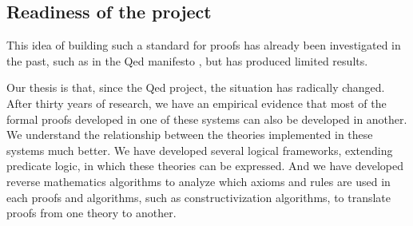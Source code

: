\subsection{Readiness of the project}

This idea of building such a standard for proofs has already been
investigated in the past, such as in the Qed manifesto \cite{Qed94}, but
has produced limited results.

Our thesis is that, since the
Qed project, the situation has radically changed. After
thirty years of research, we have an empirical evidence that most of
the formal proofs developed in one of these systems can also be
developed in another. We understand the relationship between the
theories implemented in these systems much better. We have developed
several logical frameworks, extending predicate logic, in which these
theories can be expressed. And we have developed reverse mathematics
algorithms to analyze which axioms and rules are used in each proofs
and algorithms, such as constructivization algorithms, to translate
proofs from one theory to another.


